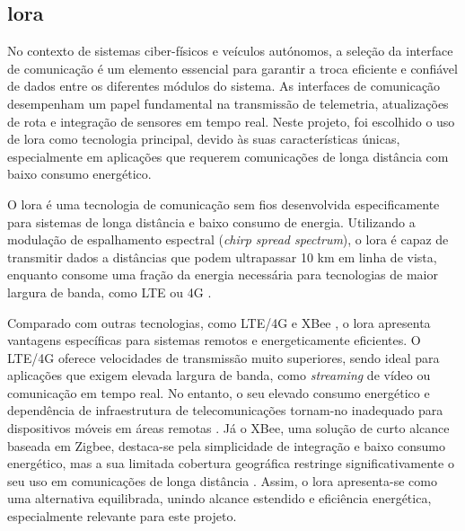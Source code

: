 \subsection{\acrfull{lora}}

No contexto de sistemas ciber-físicos e veículos autónomos, a seleção da interface de comunicação é um elemento essencial para garantir a troca eficiente e confiável de dados entre os diferentes módulos do sistema. As interfaces de comunicação desempenham um papel fundamental na transmissão de telemetria, atualizações de rota e integração de sensores em tempo real. Neste projeto, foi escolhido o uso de \gls{lora} como tecnologia principal, devido às suas características únicas, especialmente em aplicações que requerem comunicações de longa distância com baixo consumo energético.

O \gls{lora} é uma tecnologia de comunicação sem fios desenvolvida especificamente para sistemas de longa distância e baixo consumo de energia. Utilizando a modulação de espalhamento espectral (\emph{chirp spread spectrum}), o \gls{lora} é capaz de transmitir dados a distâncias que podem ultrapassar 10 km em linha de vista, enquanto consome uma fração da energia necessária para tecnologias de maior largura de banda, como LTE \cite{wikipedia-lte} ou 4G \cite{wikipedia-4g,bivocom-lte-vs-lora}.  

Comparado com outras tecnologias, como LTE/4G e XBee \cite{digi-xbee}, o \gls{lora} apresenta vantagens específicas para sistemas remotos e energeticamente eficientes. O LTE/4G oferece velocidades de transmissão muito superiores, sendo ideal para aplicações que exigem elevada largura de banda, como \textit{streaming} de vídeo ou comunicação em tempo real. No entanto, o seu elevado consumo energético e dependência de infraestrutura de telecomunicações tornam-no inadequado para dispositivos móveis em áreas remotas \cite{bivocom-lte-vs-lora}. Já o XBee, uma solução de curto alcance baseada em Zigbee, destaca-se pela simplicidade de integração e baixo consumo energético, mas a sua limitada cobertura geográfica restringe significativamente o seu uso em comunicações de longa distância \cite{digi-xbee-specs, xbee-range-comparison}. Assim, o \gls{lora} apresenta-se como uma alternativa equilibrada, unindo alcance estendido e eficiência energética, especialmente relevante para este projeto.

